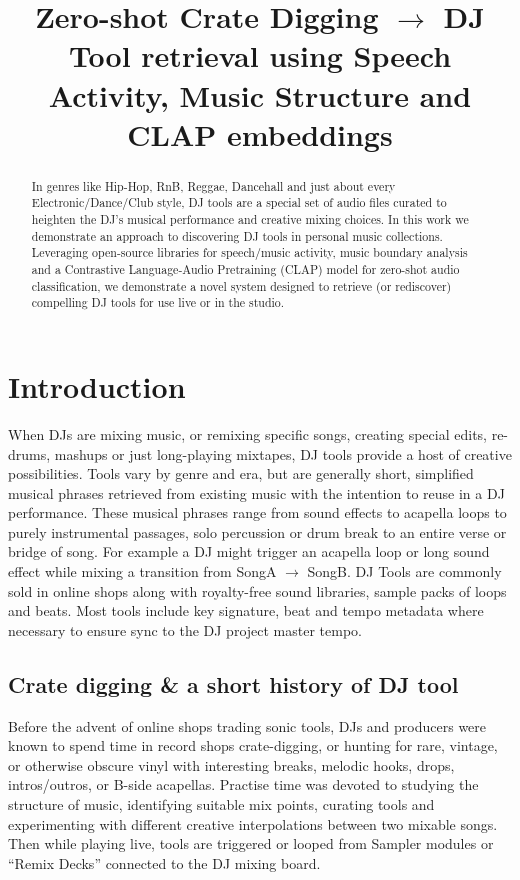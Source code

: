 \documentclass{article}
\title{Zero-shot Crate Digging $\rightarrow$ DJ Tool retrieval using Speech Activity, Music Structure and CLAP embeddings}
\begin{document}
%
\maketitle
%
\begin{abstract}
In genres like Hip-Hop, RnB, Reggae, Dancehall and just about every Electronic/Dance/Club style, DJ tools are a special set of audio files curated to heighten the DJ's musical performance and creative mixing choices. In this work we demonstrate an approach to discovering DJ tools in personal music collections. Leveraging open-source libraries for speech/music activity, music boundary analysis and a Contrastive Language-Audio Pretraining (CLAP) model for zero-shot audio classification, we demonstrate a novel system designed to retrieve (or rediscover) compelling DJ tools for use live or in the studio.
 \end{abstract}

%
\section{Introduction}\label{sec:introduction}
When DJs are mixing music, or remixing specific songs, creating special edits, re-drums, mashups or just long-playing mixtapes, DJ tools provide a host of creative possibilities. Tools vary by genre and era, but are generally short, simplified musical phrases retrieved from existing music with the intention to reuse in a DJ performance. These musical phrases range from sound effects to acapella loops to purely instrumental passages, solo percussion or drum break to an entire verse or bridge of song. For example a DJ might trigger an acapella loop or long sound effect while mixing a transition from SongA $\rightarrow$ SongB. DJ Tools are commonly sold in online shops along with royalty-free sound libraries, sample packs of loops and beats. Most tools include key signature, beat and tempo metadata where necessary to ensure sync to the DJ project master tempo.

\subsection{Crate digging \& a short history of DJ tool}\label{sec:history}

Before the advent of online shops trading sonic tools, DJs and producers were known to spend time in record shops crate-digging, or hunting for rare, vintage, or otherwise obscure vinyl with interesting breaks, melodic hooks, drops, intros/outros, or B-side acapellas. Practise time was devoted to studying the structure of music, identifying suitable mix points, curating tools and experimenting with different creative interpolations between two mixable songs. Then while playing live, tools are triggered or looped from Sampler modules or ``Remix Decks'' connected to the DJ mixing board.
\end{document}
